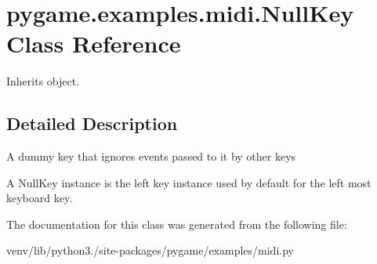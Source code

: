 \hypertarget{classpygame_1_1examples_1_1midi_1_1_null_key}{}\section{pygame.\+examples.\+midi.\+Null\+Key Class Reference}
\label{classpygame_1_1examples_1_1midi_1_1_null_key}


Inherits object.



\subsection{Detailed Description}
\begin{DoxyVerb}A dummy key that ignores events passed to it by other keys

A NullKey instance is the left key instance used by default
for the left most keyboard key.\end{DoxyVerb}
 

The documentation for this class was generated from the following file\+:\begin{DoxyCompactItemize}
\item 
venv/lib/python3./site-\/packages/pygame/examples/midi.\+py\end{DoxyCompactItemize}
